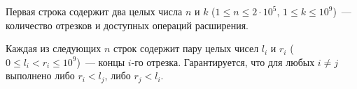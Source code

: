 Первая строка содержит два целых числа $n$ и $k$ ($1 \leq n \leq 2\cdot 10^5$, $1 \leq k \leq 10^9$)~--- количество отрезков и доступных операций расширения.

Каждая из следующих $n$ строк содержит пару целых чисел $l_i$ и $r_i$ ($0 \leq l_i < r_i \leq 10^9$)~--- концы $i$-го отрезка. Гарантируется, что для любых $i \neq j$ выполнено либо $r_i < l_j$, либо $r_j < l_i$.